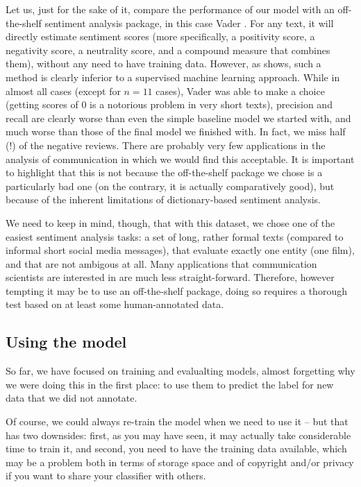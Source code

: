Let us, just for the sake of it, compare the performance of our model
with an off-the-shelf sentiment analysis package, in this case Vader
\citep{Hutto2014}. For any text, it will directly estimate sentiment
scores (more specifically, a positivity score, a negativity score, a
neutrality score, and a compound measure that combines them), without
any need to have training data. However, as  shows, such
a method is clearly inferior to a supervised machine learning
approach. While in almost all cases (except for $n=11$ cases), Vader was able to
make a choice (getting scores of 0 is a notorious problem in very
short texts), precision and recall are clearly worse than even the
simple baseline model we started with, and much worse than those of
the final model we finished with. In fact, we miss half (!) of the
negative reviews. There are probably very few applications in the
analysis of communication in which we would find this acceptable.
It is important to highlight that this is not because the off-the-shelf
package we chose is a particularly bad one (on the contrary, it is
actually comparatively good), but because of the inherent limitations
of dictionary-based sentiment analysis.


We need to keep in mind, though, that with this dataset, we chose one
of the easiest sentiment analysis tasks: a set of long, rather formal
texts (compared to informal short social media messages), that
evaluate exactly one entity (one film), and that are not ambigous at
all. Many applications that communication scientists are interested
in are much less straight-forward. Therefore, however tempting it may be
to use an off-the-shelf package, doing so requires a thorough test
based on at least some human-annotated data.



\subsection{Using the model}

So far, we have focused on training and evalualting models, almost
forgetting why we were doing this in the first place: to use them to
predict the label for new data that we did not annotate.

Of course, we could always re-train the model when we need to use it
-- but that has two downsides: first, as you may have seen, it may
actually take considerable time to train it, and second, you need to
have the training data available, which may be a problem both in terms
of storage space and of copyright and/or privacy if you want to share
your classifier with others.

